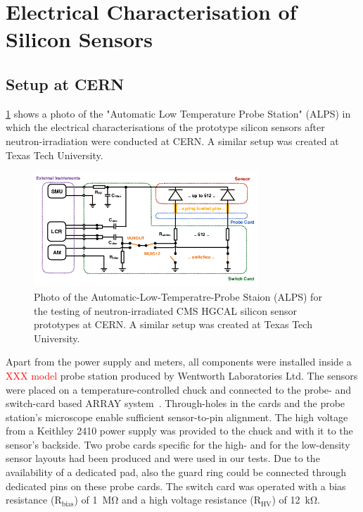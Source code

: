 \section{Electrical Characterisation of Silicon Sensors}
\label{sec:setup}
\subsection{Setup at CERN}
\label{subsec:setup_principle}
\ref{fig:ALPS_setup} shows a photo of the "Automatic Low Temperature Probe Station" (ALPS) in which the electrical characterisations of the prototype silicon sensors after neutron-irradiation were conducted at CERN. 
A similar setup was created at Texas Tech University.
\begin{figure}[h]
	\centering
	\includegraphics[width=0.75\textwidth]{figures/circuit_cards_updated.png}
	\caption{
		Photo of the Automatic-Low-Temperatre-Probe Staion (ALPS) for the testing of neutron-irradiated CMS HGCAL silicon sensor prototypes at CERN. 
		A similar setup was created at Texas Tech University.
	}
	\label{fig:ALPS_setup}
\end{figure}
Apart from the power supply and meters, all components were installed inside a \textcolor{red}{XXX model} probe station produced by Wentworth Laboratories Ltd.
The sensors were placed on a temperature-controlled chuck and connected to the probe- and switch-card based ARRAY system~\cite{pitters:array2019}.
Through-holes in the cards and the probe station's microscope  enable sufficient sensor-to-pin alignment. 
The high voltage from a Keithley 2410 power supply was provided to the chuck and with it to the sensor's backside.
Two probe cards specific for the high- and for the low-density sensor layouts had been produced and were used in our tests.
Due to the availability of a dedicated pad, also the guard ring could be connected through dedicated pins on these probe cards.
The switch card was operated with a bias resistance (R$_\text{bias}$) of \SI{1}{\mega\ohm} and a high voltage resistance (R$_\text{HV}$) of \SI{12}{\kilo\ohm}.
